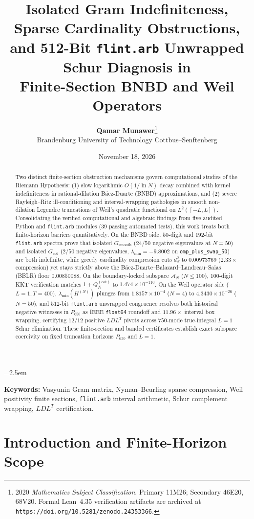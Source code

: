 \documentclass[11pt,a4paper]{article}
\title{\textbf{Isolated Gram Indefiniteness, Sparse Cardinality Obstructions,\\
and 512-Bit \texttt{flint.arb} Unwrapped Schur Diagnosis in\\
Finite-Section BNBD and Weil Operators}}
\author{\textbf{Qamar Munawer}\thanks{2020 \emph{Mathematics Subject Classification}. Primary 11M26; Secondary 46E20, 68V20. Formal Lean~4.35 verification artifacts are archived at \texttt{https://doi.org/10.5281/zenodo.24353366}.}\\[0.3em]
\small Brandenburg University of Technology Cottbus--Senftenberg}
\date{November 18, 2026}
\theoremstyle{definition}
\begin{document}
\linespread{1.15}\selectfont
\emergencystretch=2.5em

\maketitle

\begin{abstract}
Two distinct finite-section obstruction mechanisms govern computational studies of the Riemann Hypothesis: (1) slow logarithmic $O(1/\ln N)$ decay combined with kernel indefiniteness in rational-dilation B\'aez-Duarte (BNBD) approximations, and (2) severe Rayleigh--Ritz ill-conditioning and interval-wrapping pathologies in smooth non-dilation Legendre truncations of Weil's quadratic functional on $L^2([-L, L])$. Consolidating the verified computational and algebraic findings from five audited Python and \texttt{flint.arb} modules ($39$ passing automated tests), this work treats both finite-horizon barriers quantitatively. On the BNBD side, $50$-digit and $192$-bit \texttt{flint.arb} spectra prove that isolated $G_{\mathrm{smooth}}$ ($24/50$ negative eigenvalues at $N = 50$) and isolated $G_{\mathrm{cot}}$ ($2/50$ negative eigenvalues, $\lambda_{\min} = -9.8002$ on \texttt{omp\_plus\_swap\_50}) are both indefinite, while greedy cardinality compression cuts $d_S^2$ to $0.00973769$ ($2.33\times$ compression) yet stays strictly above the B\'aez-Duarte--Balazard--Landreau--Saias (BBLR) floor $0.00850088$. On the boundary-locked subspace $\mathcal{A}_N$ ($N \le 100$), $100$-digit KKT verification matches $1 + Q_N^{(\mathrm{cot})}$ to $1.474 \times 10^{-110}$. On the Weil operator side ($L = 1, T = 400$), $\lambda_{\min}(H^{(N)})$ plunges from $1.8157 \times 10^{-4}$ ($N=4$) to $4.3430 \times 10^{-26}$ ($N=50$), and $512$-bit \texttt{flint.arb} unwrapped congruence resolves both historical negative witnesses in $P_{650}$ as IEEE \texttt{float64} roundoff and $11.96\times$ interval box wrapping, certifying $12/12$ positive $LDL^T$ pivots across $750$-mode true-integral $L = 1$ Schur elimination. These finite-section and banded certificates establish exact subspace coercivity on fixed truncation horizons $P_{650}$ and $L = 1$.
\end{abstract}

\noindent\textbf{Keywords:} Vasyunin Gram matrix, Nyman--Beurling sparse compression, Weil positivity finite sections, \texttt{flint.arb} interval arithmetic, Schur complement wrapping, $LDL^T$ certification.

\section{Introduction and Finite-Horizon Scope}
\end{document}
